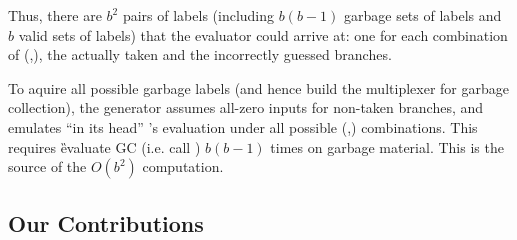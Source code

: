 Thus, there are $b^2$ pairs of labels (including  $b(b-1)$ garbage sets of labels and $b$ valid sets of labels)  that the evaluator
could arrive at: one for each combination of (\truth,\guess), the  actually taken  and
the incorrectly guessed branches. 
%


To aquire all possible garbage labels (and hence build the multiplexer for garbage collection), the \HK generator assumes all-zero inputs for non-taken branches, and emulates ``in its head'' \E's evaluation under all possible (\truth,\guess) combinations.  
This requires \G evaluate GC (i.e. call \Ev) $b(b-1)$ times on garbage material.
This is the source of the $O(b^2)$ computation.






\subsection{Our Contributions}

